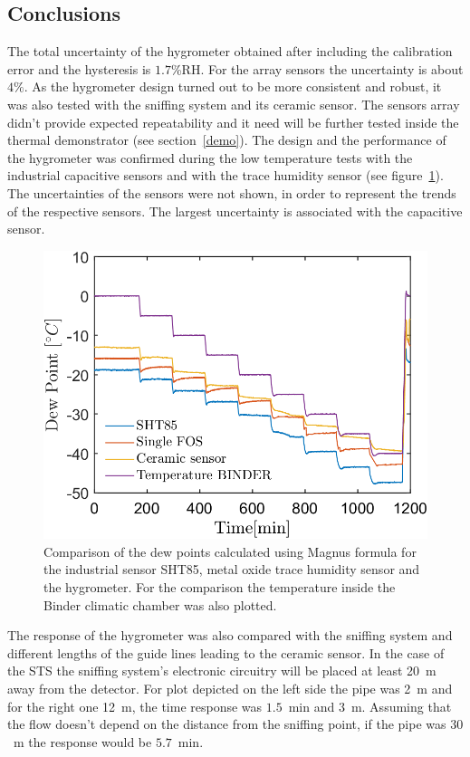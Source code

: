 \newpage
\subsection{Conclusions}
The total uncertainty of the hygrometer obtained after including the calibration error and the hysteresis is $1.7$\%RH. For the array sensors the uncertainty is about $4\%$.
As the hygrometer design turned out to be more consistent and robust, it was also tested with the sniffing system and its ceramic sensor. The sensors array didn't provide expected repeatability and it need will be further tested inside the thermal demonstrator (see section~\ref{demo}). The design and the performance of the hygrometer was confirmed during the low temperature tests with the industrial capacitive sensors and with the trace humidity sensor (see figure~\ref{fig_comparison}). The uncertainties of the sensors were not shown, in order to represent the trends of the respective sensors. The largest uncertainty is associated with the capacitive sensor. 
\begin{figure}[!h]
\centering
\includegraphics[width=0.6\columnwidth]{Chapter5/images/DPCPercent.png}
\caption{Comparison of the dew points calculated using Magnus formula for the industrial sensor SHT85, metal oxide trace humidity sensor and the hygrometer. For the comparison the temperature inside the Binder climatic chamber was also plotted.}
\label{fig_comparison}
\end{figure}
The response of the hygrometer was also compared with the sniffing system and different lengths of the guide lines leading to the ceramic sensor. In the case of the \gls{STS} the sniffing system's electronic circuitry will be placed at least \SI{20}{\metre} away from the detector. For plot depicted on the left side the pipe was \SI{2}{\metre} and for the right one \SI{12}{\metre}, the time response was $1.5$~min and $3$~m. Assuming that the flow doesn't depend on the distance from the sniffing point, if the pipe was $30$~m the response would be $5.7$~min. 
